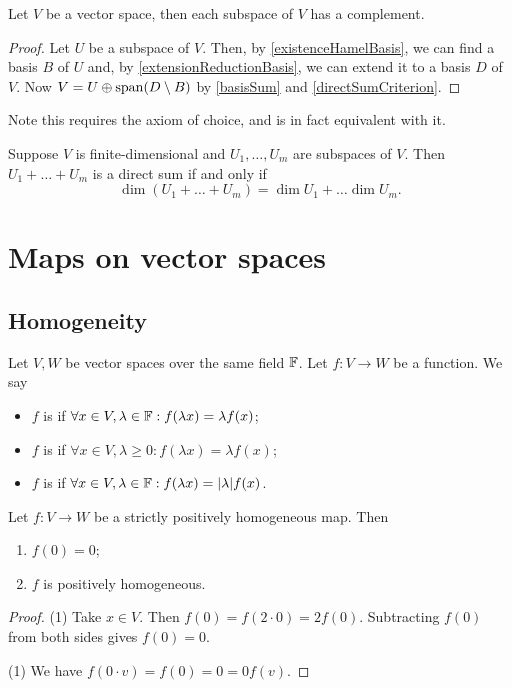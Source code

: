 \begin{proposition}
Let $V$ be a vector space, then each subspace of $V$ has a complement.
\end{proposition}
\begin{proof}
Let $U$ be a subspace of $V$. Then, by \ref{existenceHamelBasis}, we can find a basis $B$ of $U$ and, by \ref{extensionReductionBasis}, we can extend it to a basis $D$ of $V$. Now $V = U \oplus \operatorname{span}(D\setminus B)$ by \ref{basisSum} and \ref{directSumCriterion}.
\end{proof}
Note this requires the axiom of choice, and is in fact equivalent with it.
\begin{corollary}
Suppose $V$ is finite-dimensional and $U_1,\ldots, U_m$ are subspaces of $V$. Then $U_1+\ldots+ U_m$ is a direct sum \textup{if and only if}
\[ \dim(U_1+\ldots+U_m) = \dim U_1 + \ldots \dim U_m. \]
\end{corollary}


\section{Maps on vector spaces}
\subsection{Homogeneity}
\begin{definition}
Let $V, W$ be vector spaces over the same field $\mathbb{F}$. Let $f: V\to W$ be a function. We say
\begin{itemize}
\item $f$ is  if $\forall x\in V,\lambda\in \mathbb{F}: f(\lambda x) = \lambda f(x)$;
\item $f$ is  if $\forall x\in V,\lambda\geq 0: f(\lambda x) = \lambda f(x)$;
\item $f$ is  if $\forall x\in V,\lambda\in\mathbb{F}: f(\lambda x) = |\lambda| f(x)$.
\end{itemize}
\end{definition}

\begin{lemma} \label{homogeneousFunctionLemma}
Let $f: V\to W$ be a strictly positively homogeneous map. Then
\begin{enumerate}
\item $f(0) = 0$;
\item $f$ is positively homogeneous.
\end{enumerate}
\end{lemma}
\begin{proof}
(1) Take $x\in V$. Then $f(0) = f(2\cdot 0) = 2f(0)$. Subtracting $f(0)$ from both sides gives $f(0) = 0$.

(1) We have $f(0\cdot v) = f(0) = 0 = 0f(v)$.
\end{proof}


